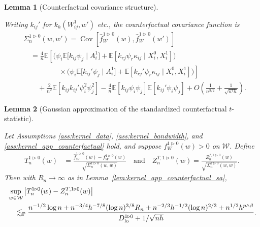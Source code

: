 \documentclass[11pt,lof]{puthesis}
\renewcommand{\P}{\ensuremath{\mathbb{P}}}
\newcommand{\E}{\ensuremath{\mathbb{E}}}
\newcommand{\cW}{\ensuremath{\mathcal{W}}}
\newcommand{\Dl}{\ensuremath{D_{\textup{lo}}}}
\DeclareMathOperator{\Cov}{Cov}
\theoremstyle{break}
\newtheorem{lemma}{Lemma}[section]
\theoremstyle{proof}
\begin{document}
\begin{lemma}[Counterfactual covariance structure]
\label{lem:kernel_app_counterfactual_covariance_structure}

Writing $k_{i j}'$ for $k_h(W_{i j}^1, w')$ etc.,
the counterfactual covariance function is
%
\begin{align*}
&\Sigma_n^{1 \triangleright 0}(w,w')
= \Cov\left[
\hat f_W^{1 \triangleright 0}(w),
\hat f_W^{1 \triangleright 0}(w')
\right] \\
&\quad=
\frac{4}{n}
\E\left[
\Big(
\psi_i
\E\big[
k_{i j} \psi_j
\mid A_i^1
\big]
+ \E\left[
k_{r j} \psi_r
\kappa_{i j}
\mid X_i^0, X_i^1
\right]
\Big)
\right. \\
&\left.
\qquad\qquad\quad
\times
\Big(
\psi_i
\E\big[
k_{i j}' \psi_j
\mid A_i^1
\big]
+ \E\left[
k_{r j}' \psi_r \kappa_{i j}
\mid X_i^0, X_i^1
\right]
\Big)
\right] \\
&\qquad+
\frac{2}{n^2}
\E\left[
k_{i j} k_{i j}'
\psi_i^2 \psi_j^2
\right]
- \frac{4}{n}
\E\left[
k_{i j} \psi_i \psi_j
\right]
\E\left[
k_{i j}' \psi_i \psi_j
\right]
+ O\left( \frac{1}{n^{3/2}} + \frac{1}{\sqrt{n^4h}} \right).
\end{align*}

\end{lemma}

\begin{lemma}[Gaussian approximation
of the standardized counterfactual $t$-statistic]
\label{lem:kernel_app_counterfactual_infeasible_t_statistic}

Let Assumptions \ref{ass:kernel_data},
\ref{ass:kernel_bandwidth}, and
\ref{ass:kernel_app_counterfactual}
hold, and suppose
$f_W^{1 \triangleright 0}(w) > 0$ on $\cW$.
Define
%
\begin{align*}
T_n^{1 \triangleright 0}(w)
&= \frac{\hat f_W^{1 \triangleright 0}(w)
- f_W^{1 \triangleright 0}(w)}
{\sqrt{\Sigma_n^{1 \triangleright 0}(w,w)}}
\quad\text{and}\quad
Z_n^{T, 1 \triangleright 0}(w)
= \frac{Z_n^{f, 1 \triangleright 0}(w)}
{\sqrt{\Sigma_n^{1 \triangleright 0}(w,w)}}.
\end{align*}
%
Then with $R_n \to \infty$ as in Lemma~\ref{lem:kernel_app_counterfactual_sa},
%
\begin{align*}
&\sup_{w \in \cW}
\left|
T_n^{1 \triangleright 0}(w) - Z_n^{T, 1 \triangleright 0}(w)
\right| \\
&\quad\lesssim_\P
\frac{
n^{-1/2} \log n
+ n^{-3/4} h^{-7/8} (\log n)^{3/8} R_n
+ n^{-2/3} h^{-1/2} (\log n)^{2/3}
+ n^{1/2} h^{p \wedge \beta}}
{\Dl^{1 \triangleright 0} + 1/\sqrt{n h}}.
\end{align*}

\end{lemma}
\end{document}
